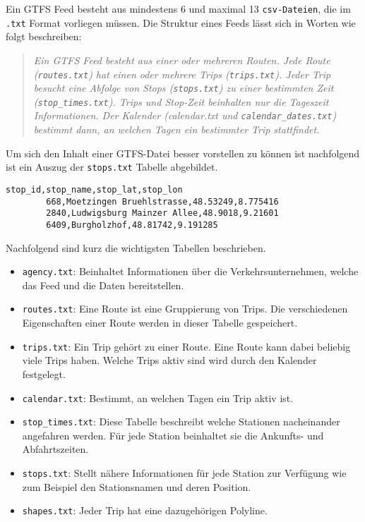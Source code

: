       Ein GTFS Feed besteht aus mindestens 6 und maximal 13 \texttt{csv-Dateien}, die im \texttt{.txt} Format vorliegen müssen. Die Struktur eines Feeds lässt sich in Worten wie folgt beschreiben:

      \begin{quote}
        \textit{Ein GTFS Feed besteht aus einer oder mehreren Routen. Jede Route (\texttt{routes.txt}) hat einen oder mehrere Trips (\texttt{trips.txt}). Jeder Trip besucht eine Abfolge von Stops (\texttt{stops.txt}) zu einer bestimmten Zeit (\texttt{stop\_times.txt}). Trips und Stop-Zeit beinhalten nur die Tageszeit Informationen. Der Kalender (calendar.txt und \texttt{calendar\_dates.txt}) bestimmt dann, an welchen Tagen ein bestimmter Trip stattfindet.} \cite[S. 8]{zervaas}
      \end{quote}

      Um sich den Inhalt einer GTFS-Datei besser vorstellen zu können ist nachfolgend ist ein Auszug der \texttt{stops.txt} Tabelle abgebildet.

      \begin{lstlisting}[captionpos=b, caption=Auszug der ersten Zeilen von \texttt{stops.txt}, label=lst:gtfs-auszug]
        stop_id,stop_name,stop_lat,stop_lon
        668,Moetzingen Bruehlstrasse,48.53249,8.775416
        2840,Ludwigsburg Mainzer Allee,48.9018,9.21601
        6409,Burgholzhof,48.81742,9.191285
      \end{lstlisting}

      Nachfolgend sind kurz die wichtigsten Tabellen beschrieben.

      \begin{itemize}
        \item \texttt{agency.txt}: Beinhaltet Informationen über die Verkehrsunternehmen, welche das Feed und die Daten bereitstellen.

        \item \texttt{routes.txt}: Eine Route ist eine Gruppierung von Trips. Die verschiedenen Eigenschaften einer Route werden in dieser Tabelle gespeichert.

        \item \texttt{trips.txt}: Ein Trip gehört zu einer Route. Eine Route kann dabei beliebig viele Trips haben. Welche Trips aktiv sind wird durch den Kalender festgelegt.

        \item \texttt{calendar.txt}: Bestimmt, an welchen Tagen ein Trip aktiv ist.

        \item \texttt{stop\_times.txt}: Diese Tabelle beschreibt welche Stationen nacheinander angefahren werden. Für jede Station beinhaltet sie die Ankunfts- und Abfahrtszeiten.

        \item \texttt{stops.txt}: Stellt nähere Informationen für jede Station zur Verfügung wie zum Beispiel den Stationsnamen und deren Position.

        \item \texttt{shapes.txt}: Jeder Trip hat eine dazugehörigen Polyline.

      \end{itemize}

